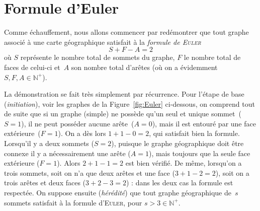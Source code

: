 \documentclass[french]{report}
\begin{document}
\section{Formule d'Euler}

Comme échauffement, nous allons commencer par redémontrer que tout graphe associé à une carte géographique satisfait à la \textit{formule de \textsc{Euler}} $$S+F-A=2$$ où $S$ représente le nombre total de sommets du graphe, $F$ le nombre total de faces de celui-ci et~$A$ son nombre total d'arêtes (où on a évidemment $S, F, A \in\mathbb{N}^+$).\smallskip

\begin{figure}[b!]
\end{figure}

La démonstration se fait très simplement par récurrence. Pour l'étape de base (\textit{initiation}), voir les graphes de la Figure~\ref{fig:Euler} ci-dessous, on comprend tout de suite que si un graphe (simple) ne possède qu'un seul et unique sommet~($S=1$), il ne peut posséder aucune arête~($A=0$), mais il est entouré par une face extérieure~($F=1$). On a dès lors $1+1-0=2$, qui satisfait bien la formule. Lorsqu'il y a deux sommets ($S=2$), puisque le graphe géographique doit être connexe il y a nécessairement une arête ($A=1$), mais toujours que la seule face extérieure ($F=1$). Alors $2+1-1=2$ est bien vérifié. De même, lorsqu'on a trois sommets, soit on n'a que deux arêtes et une face ($3+1-2=2$), soit on a trois arêtes et deux faces ($3+2-3=2$) : dans les deux cas la formule est respectée. On suppose ensuite (\textit{hérédité}) que tout graphe géographique de~$s$ sommets satisfait à la formule d'\textsc{Euler}, pour $s>3\in\mathbb{N}^+$.
\end{document}
